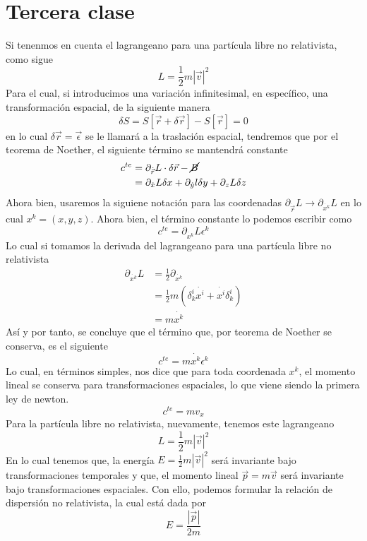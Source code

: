 \documentclass[../main.tex]{subfiles}
\begin{document}
\section{Tercera clase}
Si tenenmos en cuenta el lagrangeano para una partícula libre no relativista, como sigue
\begin{equation}
    L=\frac{1}{2}m|\vec{v}|^2
\end{equation}
Para el cual, si introducimos una variación infinitesimal, en específico, una transformación espacial, de la siguiente manera
\begin{equation}
    \delta S= S[\vec{r}+\delta \vec{r}] - S[\vec{r}]=0
\end{equation}
en lo cual $\delta\vec{r}=\vec{\epsilon}$ se le llamará a la traslación espacial, tendremos que por el teorema de Noether, el siguiente término se mantendrá constante
\begin{align}
    c^{te} &=\partial_{\dot{\vec{r}}} L \cdot \delta \vec{r} - \cancel{B} \\
    & = \partial_{\dot{x}}L \delta x + \partial_{\dot{y}}l \delta y + \partial_{z}L\delta z
\end{align}
Ahora bien, usaremos la siguiene notación para las coordenadas $\partial_{\dot{\vec{r}}}L \xrightarrow{}\partial_{\dot{x^k}}L $ en lo cual $x^k=(x,y,z)$. Ahora bien, el término constante lo podemos escribir como
\begin{equation}
    c^{te}=\partial_{\dot{x^k}}L \epsilon^k
\end{equation}
Lo cual si tomamos la derivada del lagrangeano para una partícula libre no relativista
\begin{align}
    \partial_{\dot{x^k}}L & =\frac{1}{2} \partial_{\dot{x^k}} \\
    & = \frac{1}{2}m (\delta_k^i \dot{x^i} + \dot{x^i}\delta_k^i) \\
    & = m\dot{x^k}
\end{align}
Así y por tanto, se concluye que el término que, por teorema de Noether se conserva, es el siguiente
\begin{equation}
    c^{te}=m\dot{x^k}\epsilon^k
\end{equation}
Lo cual, en términos simples, nos dice que para toda coordenada $x^k$, el momento lineal se conserva para transformaciones espaciales, lo que viene siendo la primera ley de newton.
\begin{equation}
    c^{te}=mv_x
\end{equation}
Para la partícula libre no relativista, nuevamente, tenemos este lagrangeano
\begin{equation}
    L=\frac{1}{2}m|\vec{v}|^2
\end{equation}
En lo cual tenemos que, la energía $E=\frac{1}{2}m|\vec{v}|^2$ será invariante bajo transformaciones temporales y que, el momento lineal $\vec{p}=m\vec{v}$ será invariante bajo transformaciones espaciales. Con ello, podemos formular la relación de dispersión no relativista, la cual está dada por
\begin{equation}
    E=\frac{|\vec{p}|}{2m}
\end{equation}
\end{document}
